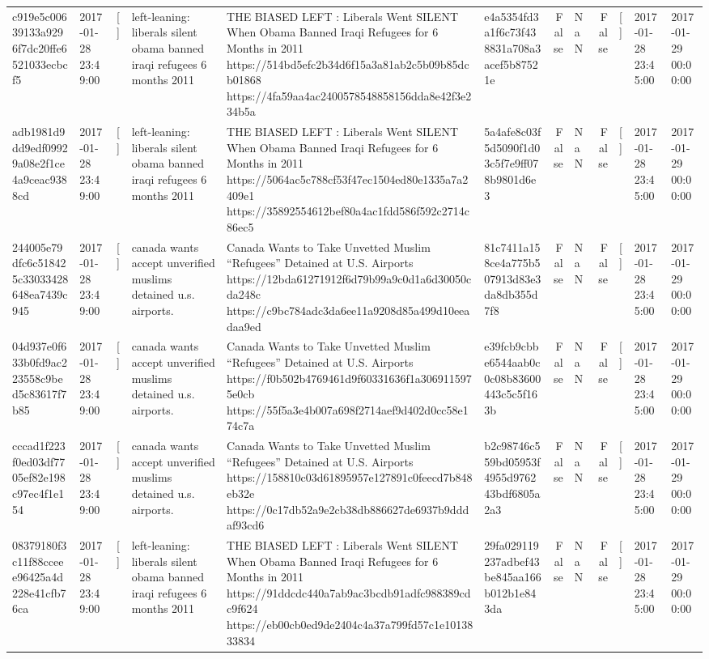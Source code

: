 \begin{tabular}{llllllrlrlll}
c919e5c00639133a9296f7dc20ffe6521033ecbcf5 & 2017-01-28 23:49:00 & [] & left-leaning: liberals silent obama banned iraqi refugees 6 months 2011 & THE BIASED LEFT : Liberals Went SILENT When Obama Banned Iraqi Refugees for 6 Months in 2011 https://514bd5efc2b34d6f15a3a81ab2c5b09b85dcb01868 https://4fa59aa4ac2400578548858156dda8e42f3e234b5a & e4a5354fd3a1f6c73f438831a708a3acef5b87521e & False & NaN & False & [] & 2017-01-28 23:45:00 & 2017-01-29 00:00:00 \\
adb1981d9dd9edf09929a08e2f1ce4a9ceac9388cd & 2017-01-28 23:49:00 & [] & left-leaning: liberals silent obama banned iraqi refugees 6 months 2011 & THE BIASED LEFT : Liberals Went SILENT When Obama Banned Iraqi Refugees for 6 Months in 2011 https://5064ac5c788cf53f47ec1504ed80e1335a7a2409e1 https://35892554612bef80a4ac1fdd586f592c2714c86ec5 & 5a4afe8c03f5d5090f1d03c5f7e9ff078b9801d6e3 & False & NaN & False & [] & 2017-01-28 23:45:00 & 2017-01-29 00:00:00 \\
244005e79dfc6c518425c33033428648ea7439c945 & 2017-01-28 23:49:00 & [] & canada wants accept unverified muslims detained u.s. airports. & Canada Wants to Take Unvetted Muslim “Refugees” Detained at U.S. Airports https://12bda61271912f6d79b99a9c0d1a6d30050cda248c https://c9bc784adc3da6ee11a9208d85a499d10eeadaa9ed & 81c7411a158ce4a775b507913d83e3da8db355d7f8 & False & NaN & False & [] & 2017-01-28 23:45:00 & 2017-01-29 00:00:00 \\
04d937e0f633b0fd9ac223558c9bed5c83617f7b85 & 2017-01-28 23:49:00 & [] & canada wants accept unverified muslims detained u.s. airports. & Canada Wants to Take Unvetted Muslim “Refugees” Detained at U.S. Airports https://f0b502b4769461d9f60331636f1a3069115975e0cb https://55f5a3e4b007a698f2714aef9d402d0cc58e174c7a & e39fcb9cbbe6544aab0c0c08b83600443c5c5f163b & False & NaN & False & [] & 2017-01-28 23:45:00 & 2017-01-29 00:00:00 \\
cccad1f223f0ed03df7705ef82e198c97ec4f1e154 & 2017-01-28 23:49:00 & [] & canada wants accept unverified muslims detained u.s. airports. & Canada Wants to Take Unvetted Muslim “Refugees” Detained at U.S. Airports https://158810c03d61895957e127891c0feecd7b848eb32e https://0c17db52a9e2cb38db886627de6937b9dddaf93cd6 & b2c98746c559bd05953f4955d976243bdf6805a2a3 & False & NaN & False & [] & 2017-01-28 23:45:00 & 2017-01-29 00:00:00 \\
08379180f3c11f88cceee96425a4d228e41cfb76ca & 2017-01-28 23:49:00 & [] & left-leaning: liberals silent obama banned iraqi refugees 6 months 2011 & THE BIASED LEFT : Liberals Went SILENT When Obama Banned Iraqi Refugees for 6 Months in 2011 https://91ddcdc440a7ab9ac3bcdb91adfc988389cdc9f624 https://eb00cb0ed9de2404c4a37a799fd57c1e1013833834 & 29fa029119237adbef43be845aa166b012b1e843da & False & NaN & False & [] & 2017-01-28 23:45:00 & 2017-01-29 00:00:00 \\

\end{tabular}
